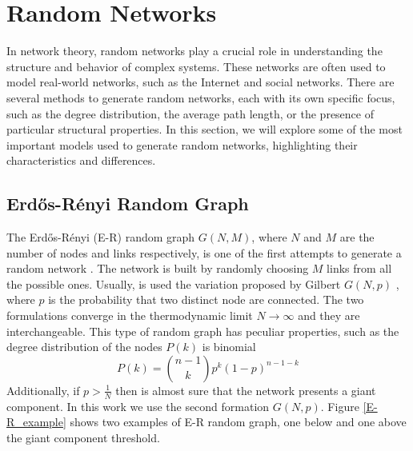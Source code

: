 \section{Random Networks}
In network theory, random networks play a crucial role in understanding the structure and behavior of complex systems. These networks are often used to model real-world networks, such as the Internet and social networks. There are several methods to generate random networks, each with its own specific focus, such as the degree distribution, the average path length, or the presence of particular structural properties. In this section, we will explore some of the most important models used to generate random networks, highlighting their characteristics and differences.

\subsection{Erd\H{o}s-Rényi Random Graph}

The Erd\H{o}s-Rényi (E-R) random graph $G(N,M)$, where $N$ and $M$ are the number of nodes and links respectively, is one of the first attempts to generate a random network \cite{erdos-renyi1960, Erdos-renyi1959}. The network is built by randomly choosing $M$ links from all the possible ones. Usually, is used the variation proposed by Gilbert $G(N,p)$ \cite{gilbert} , where $p$ is the probability that two distinct node are connected. The two formulations converge in the thermodynamic limit $N \rightarrow \infty$ and they are interchangeable.
This type of random graph has peculiar properties, such as the degree distribution of the nodes $P(k)$ is binomial
\begin{equation}
    P(k) = \binom{n-1}{k}p^k(1-p)^{n-1-k}
\end{equation} 
Additionally, if $p > \frac{1}{N}$ then is almost sure that the network presents a giant component.
In this work we use the second formation $G(N,p)$. Figure \ref{E-R_example} shows two examples of E-R random graph, one below and one above the giant component threshold.

